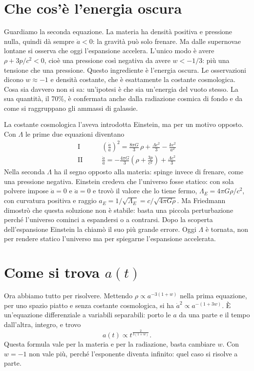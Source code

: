 \documentclass[12pt,a4paper]{article}
\begin{document}
\section{Che cos'è l'energia oscura}
Guardiamo la seconda equazione. La materia ha densità positiva e pressione nulla, quindi dà sempre $\ddot a < 0$: la gravità può solo frenare. Ma dalle supernovae lontane si osserva che oggi l'espansione accelera. L'unico modo è avere $\rho + 3p/c^2 < 0$, cioè una pressione così negativa da avere $w < -1/3$: più una tensione che una pressione. Questo ingrediente è l'energia oscura. Le osservazioni dicono $w \approx -1$ e densità costante, che è esattamente la costante cosmologica. Cosa sia davvero non si sa: un'ipotesi è che sia un'energia del vuoto stesso. La sua quantità, il 70\%, è confermata anche dalla radiazione cosmica di fondo e da come si raggruppano gli ammassi di galassie.

La costante cosmologica l'aveva introdotta Einstein, ma per un motivo opposto. Con $\Lambda$ le prime due equazioni diventano
\begin{align*}
\text{I} \qquad & \left(\frac{\dot a}{a}\right)^2 = \frac{8\pi G}{3}\,\rho + \frac{\Lambda c^2}{3} - \frac{k c^2}{a^2} \\[2pt]
\text{II} \qquad & \frac{\ddot a}{a} = -\frac{4\pi G}{3}\left(\rho + \frac{3p}{c^2}\right) + \frac{\Lambda c^2}{3}
\end{align*}
Nella seconda $\Lambda$ ha il segno opposto alla materia: spinge invece di frenare, come una pressione negativa. Einstein credeva che l'universo fosse statico: con sola polvere impose $\dot a = 0$ e $\ddot a = 0$ e trovò il valore che lo tiene fermo, $\Lambda_E = 4\pi G\rho/c^2$, con curvatura positiva e raggio $a_E = 1/\sqrt{\Lambda_E} = c/\sqrt{4\pi G\rho}$. Ma Friedmann dimostrò che questa soluzione non è stabile: basta una piccola perturbazione perché l'universo cominci a espandersi o a contrarsi. Dopo la scoperta dell'espansione Einstein la chiamò il suo più grande errore. Oggi $\Lambda$ è tornata, non per rendere statico l'universo ma per spiegarne l'espansione accelerata.

\section{Come si trova $a(t)$}
Ora abbiamo tutto per risolvere. Mettendo $\rho \propto a^{-3(1+w)}$ nella prima equazione, per uno spazio piatto e senza costante cosmologica, si ha $\dot a^2 \propto a^{-(1+3w)}$. È un'equazione differenziale a variabili separabili: porto le $a$ da una parte e il tempo dall'altra, integro, e trovo
\[ a(t) \propto t^{\frac{2}{3(1+w)}} . \]
Questa formula vale per la materia e per la radiazione, basta cambiare $w$. Con $w = -1$ non vale più, perché l'esponente diventa infinito: quel caso si risolve a parte.
\end{document}
